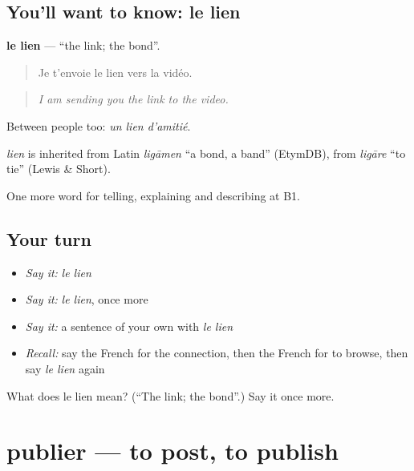\subsection*{You'll want to know: le lien}
\textbf{le lien} — \textquotedblleft{}the link; the bond\textquotedblright{}.

\begin{quote}
Je t'envoie le lien vers la vidéo.
\end{quote}

\begin{quote}
\emph{I am sending you the link to the video.}
\end{quote}

Between people too: \emph{un lien d'amitié}.

\begin{cousinweb}
\emph{lien} is inherited from Latin \emph{ligāmen} \textquotedblleft{}a bond, a band\textquotedblright{} (EtymDB), from \emph{ligāre} \textquotedblleft{}to tie\textquotedblright{} (Lewis \& Short).
\end{cousinweb}

\begin{grammarlens}[title={What you've built}]
One more word for telling, explaining and describing at B1.
\end{grammarlens}

\subsection*{Your turn}
\begin{itemize}
\raggedright
  \item \emph{Say it:} \emph{le lien}
  \item \emph{Say it:} \emph{le lien}, once more
  \item \emph{Say it:} a sentence of your own with \emph{le lien}
  \item \emph{Recall:} say the French for the connection, then the French for to browse, then say \emph{le lien} again
\end{itemize}

\begin{tcolorbox}[breakable,colback=teal!4,colframe=teal!35!black,title={Before you move on}]
What does le lien mean? (\textquotedblleft{}The link; the bond\textquotedblright{}.) Say it once more.
\end{tcolorbox}
\section[publier]{publier — to post, to publish}

